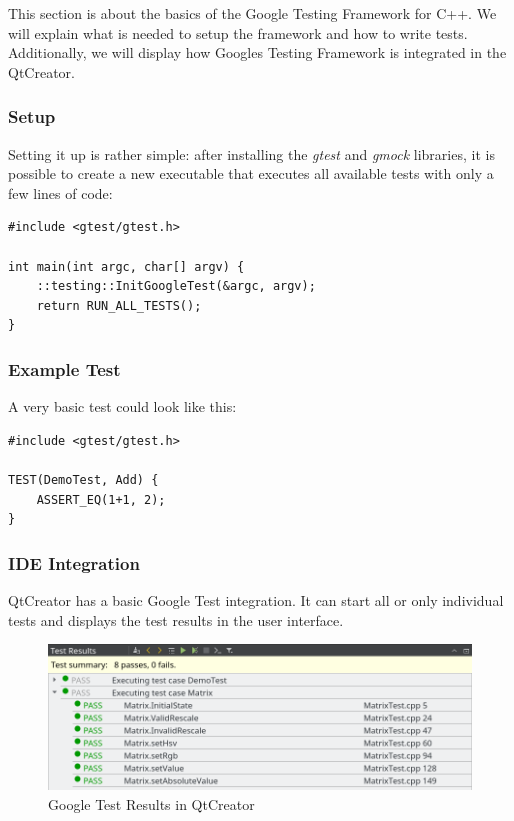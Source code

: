 \documentclass{scrreprt}
\begin{document}
This section is about the basics of the Google Testing Framework for C++. We will explain what is needed to setup the framework and how to write tests. Additionally, we will display how Googles Testing Framework is integrated in the QtCreator.

\subsubsection{Setup}

Setting it up is rather simple: after installing the \textit{gtest} and \textit{gmock} libraries, it is possible to create a new executable that executes all available tests with only a few lines of code:

\bigskip
\begin{lstlisting}[title=tests-google/main.cpp]
#include <gtest/gtest.h>

int main(int argc, char[] argv) {
	::testing::InitGoogleTest(&argc, argv);
	return RUN_ALL_TESTS();
}
\end{lstlisting}
\bigskip

\subsubsection{Example Test}

A very basic test could look like this:

\bigskip
\begin{lstlisting}[title=tests-google/Demo.cpp]
#include <gtest/gtest.h>

TEST(DemoTest, Add) {
	ASSERT_EQ(1+1, 2);
}
\end{lstlisting}
\bigskip

\subsubsection{IDE Integration}

QtCreator has a basic Google Test integration. It can start all or only individual tests and displays the test results in the user interface.

\begin{figure}[h]
	\centering
	\includegraphics[width=1.0\textwidth]{img/qtcreator_test_results}
	\caption[QtCreator Google Test Results]{Google Test Results in QtCreator}
	\label{fig:qtcreator_test_results}
\end{figure}
\end{document}
